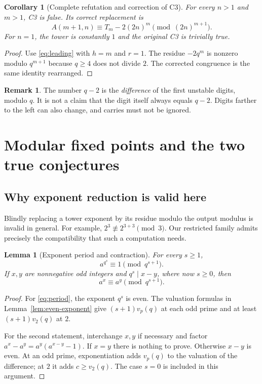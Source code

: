 \documentclass[11pt,a4paper]{article}
\numberwithin{equation}{section}
\theoremstyle{plain}
\newtheorem{lemma}[theorem]{Lemma}
\newtheorem{corollary}[theorem]{Corollary}
\theoremstyle{definition}
\newtheorem{remark}[theorem]{Remark}
\begin{document}
\begin{corollary}[Complete refutation and correction of C3]\label{cor:C3}
For every $n>1$ and $m>1$, C3 is false.  Its correct replacement is
\begin{equation}\label{eq:correct-C3}
 A(m+1,n)\equiv T_m-2(2n)^m\pmod{(2n)^{m+1}}.
\end{equation}
For $n=1$, the tower is constantly $1$ and the original C3 is trivially true.
\end{corollary}
\begin{proof}
Use \eqref{eq:leading} with $h=m$ and $r=1$.
The residue $-2q^m$ is nonzero modulo $q^{m+1}$ because $q\ge4$ does
not divide $2$.  The corrected congruence is the same identity rearranged.
\end{proof}

\begin{remark}
The number $q-2$ is the \emph{difference} of the first unstable digits,
modulo $q$.  It is not a claim that the digit itself always equals
$q-2$.  Digits farther to the left can also change, and carries must
not be ignored.
\end{remark}

\section{Modular fixed points and the two true conjectures}\label{sec:fixed}

\subsection{Why exponent reduction is valid here}
Blindly replacing a tower exponent by its residue modulo the output
modulus is invalid in general.  For example,
$2^3\not\equiv2^{3+3}\pmod3$.
Our restricted family admits precisely the compatibility that such a
computation needs.

\begin{lemma}[Exponent period and contraction]\label{lem:contraction}
For every $s\ge1$,
\begin{equation}\label{eq:period}
 a^{q^s}\equiv1\pmod{q^{s+1}}.
\end{equation}
If $x,y$ are nonnegative odd integers and $q^s\mid x-y$, where now
$s\ge0$, then
\begin{equation}\label{eq:contraction}
 a^x\equiv a^y\pmod{q^{s+1}}.
\end{equation}
\end{lemma}
\begin{proof}
For \eqref{eq:period}, the exponent $q^s$ is even.
The valuation formulas in Lemma~\ref{lem:even-exponent} give
$(s+1)v_p(q)$ at each odd prime and at least $(s+1)v_2(q)$ at $2$.

For the second statement, interchange $x,y$ if necessary and factor
$a^x-a^y=a^y(a^{x-y}-1)$.  If $x=y$ there is nothing to prove.
Otherwise $x-y$ is even.  At an odd prime, exponentiation adds
$v_p(q)$ to the valuation of the difference; at $2$ it adds
$c\ge v_2(q)$.  The case $s=0$ is included in this argument.
\end{proof}
\end{document}
